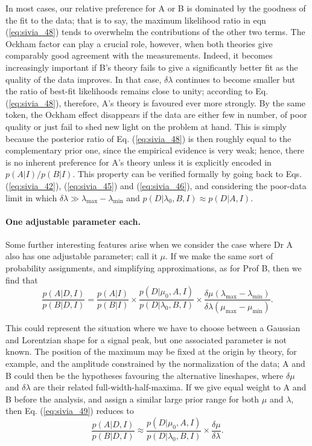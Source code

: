 \documentclass[%
oneside,                 %
final,                   %
10pt]{article}
\begin{document}
In most cases, our relative preference for A or B is dominated by the goodness of the fit to the data; that is to say, the maximum likelihood ratio in eqn (\ref{eq:sivia_48}) tends to overwhelm the contributions of the other two terms. The Ockham factor can play a crucial role, however, when both theories give comparably good agreement with the measurements. Indeed, it becomes increasingly important if B’s theory fails to give a significantly better fit as the quality of the data improves. In that case, $\delta\lambda$ continues to become smaller but the ratio of best-fit likelihoods remains close to unity; according to Eq. (\ref{eq:sivia_48}), therefore, A’s theory is favoured ever more strongly. By the same token, the Ockham effect disappears if the data are either few in number, of poor quality or just fail to shed new light on the problem at hand. This is simply because the posterior ratio of Eq. (\ref{eq:sivia_48}) is then roughly equal to the complementary prior one, since the empirical evidence is very weak; hence, there is no inherent preference for A’s theory unless it is explicitly encoded in $p(A|I)/p(B|I)$. This property can be verified formally by going back to Eqs. (\ref{eq:sivia_42}), (\ref{eq:sivia_45}) and (\ref{eq:sivia_46}), and considering the poor-data limit in which 
$\delta\lambda \gg \lambda_\mathrm{max}-\lambda_\mathrm{min}$ and $p(D|\lambda_0,B,I) \approx p(D|A,I)$.

\paragraph{One adjustable parameter each.}
Some further interesting features arise when we consider the case where Dr A also has one adjustable parameter; call it $\mu$. If we make the same sort of probability assignments, and simplifying approximations, as for Prof B, then we find that
\begin{equation}
\frac{p(A|D,I)}{p(B|D,I)} =  \frac{p(A|I)}{p(B|I)} \times \frac{p(D|\mu_0,A,I)}{p(D|\lambda_0,B,I)} \times \frac{\delta\mu(\lambda_\mathrm{max} - \lambda_\mathrm{min})}{\delta\lambda(\mu_\mathrm{max} - \mu_\mathrm{min})}. 
\label{eq:sivia_49}
\end{equation}

This could represent the situation where we have to choose between a Gaussian and Lorentzian shape for a signal peak, but one associated parameter is not known. The position of the maximum may be fixed at the origin by theory, for example, and the amplitude constrained by the normalization of the data; A and B could then be the hypotheses favouring the alternative lineshapes, where $\delta\mu$ and $\delta\lambda$ are their related full-width-half-maxima. If we give equal weight to A and B before the analysis, and assign a similar large prior range for both $\mu$ and $\lambda$, then Eq. (\ref{eq:sivia_49}) reduces to
$$
\frac{p(A|D,I)}{p(B|D,I)} \approx  \frac{p(D|\mu_0,A,I)}{p(D|\lambda_0,B,I)} \times \frac{\delta\mu}{\delta\lambda}. 
$$
\end{document}
